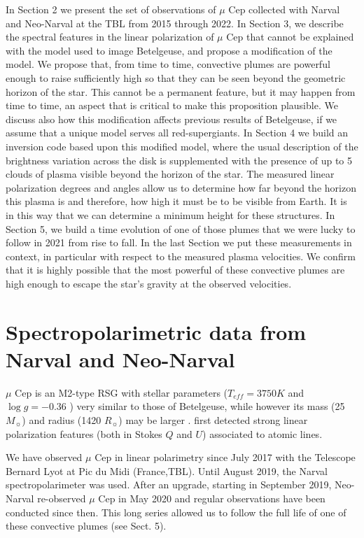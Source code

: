 \documentclass{/Users/art2/TeX/aanda/aa}
\begin{document}
In Section 2 we present the set of observations of $\mu$ Cep collected  with Narval and Neo-Narval at the TBL from 2015 through 2022.
 In Section 3, we describe the spectral features in the linear polarization of $\mu$ Cep that cannot be explained with the model used to image Betelgeuse, and propose a modification of the model. We propose that, from time to time, convective plumes are powerful enough to raise sufficiently high so that they can be seen beyond the geometric horizon of the star.  This cannot be a permanent feature, but it may happen from time to time, an aspect that is critical to make this proposition plausible. We discuss also how this modification affects previous results of Betelgeuse, if we assume that a unique model serves all red-supergiants.
In Section 4 we build an inversion code based upon this modified model, where the usual description of the brightness variation across the disk is supplemented with the presence of up to 5 clouds of plasma visible beyond the horizon of the star. The measured linear polarization degrees and angles allow us to determine how far beyond the horizon this plasma is and therefore, how high it must be to be visible from Earth. It is in this way that we can determine a minimum height for these structures. In Section 5, we build a time evolution of one of those plumes that we were lucky to follow  in 2021 from rise to fall. In the last Section we put these measurements in context, in particular with  respect to the measured plasma velocities. We confirm that it is highly possible that the most powerful of these convective plumes are high enough to escape the star's gravity at the observed velocities. 
 
 
\section{Spectropolarimetric data from  Narval and Neo-Narval}
 

$\mu$ Cep is an M2-type RSG with stellar parameters ($T_{eff} = 3750 K$ and $\log g = -0.36$ ) very similar to those of Betelgeuse, while however  its mass (25$M_\sun$)  and radius (1420 $R_\sun$) may be larger \citep{levesque_physical_2005}. \cite{tessore_measuring_2017}  first detected strong linear polarization features (both in Stokes $Q$ and  $U$) associated to atomic lines.

We have observed  $\mu$ Cep in linear polarimetry since July 2017 with the Telescope Bernard Lyot at Pic du Midi (France,TBL). Until August 2019, the Narval spectropolarimeter was used. After an upgrade, starting in September 2019,  Neo-Narval re-observed $\mu$ Cep in May 2020 and regular observations have been conducted since then. This long series allowed us to follow the full life of one of these convective plumes (see Sect. 5).
\end{document}
